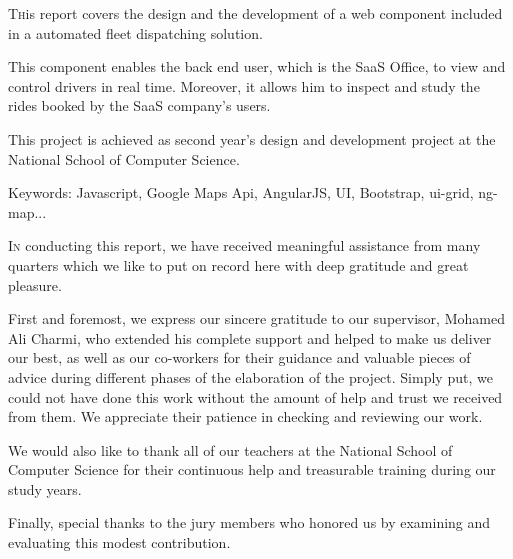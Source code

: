 \begin{resume}
\bigskip

\lettrine[lines=2]{T}his report covers the design and the development of a web component included in a automated fleet dispatching solution.

This component enables the back end user, which is the SaaS Office, to view and control drivers in real time. Moreover, it allows him to inspect and study the rides booked by the SaaS company's users.

This project is achieved as second year's design and development project at the National School of Computer Science.

Keywords: Javascript, Google Maps Api, AngularJS, UI, Bootstrap, ui-grid, ng-map...

\end{resume}
\begin{center} 
\begin{Signatures}

\end{Signatures}
\end{center}
\begin{acknowledgement}


{

\bigskip
\lettrine[lines=2]{I}n conducting this report, we have received meaningful assistance from many quarters which we
like to put on record here with deep gratitude and great pleasure.


First and foremost, we express our sincere gratitude to our supervisor,  Mohamed Ali Charmi, who extended his complete support and helped to make us deliver our best, as well as our co-workers for their guidance and valuable pieces of advice during different phases of the elaboration of the project.
Simply put, we could not have done this work without the amount of help and trust we received from them. We appreciate their patience in checking and reviewing our work.
\bigskip

We would also like to thank all of our teachers at the National School of Computer Science for their continuous help and treasurable training during our study years.

Finally, special thanks to the jury members who honored us by examining and evaluating this modest contribution.}
\end{acknowledgement}